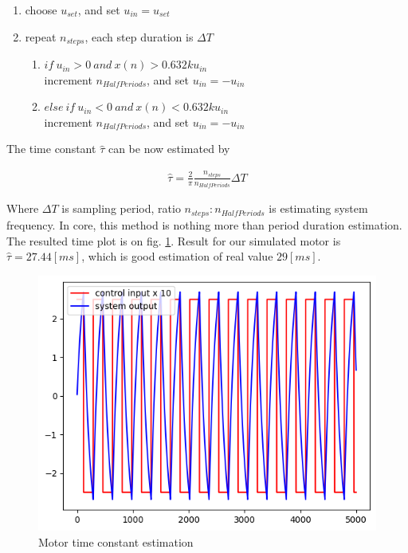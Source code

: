 \documentclass[12pt,twoside,onecolumn,openany,extrafontsizes,dvipsnames]{memoir}
\begin{document}
            \begin{enumerate}
                \item choose $u_{set}$, and set $u_{in} = u_{set}$
                \item repeat $n_{steps}$, each step duration is $\Delta T$
                    \begin{enumerate}
                        \item $if\ u_{in} > 0\ and\ x(n) > 0.632ku_{in}$ \\
                            increment $n_{HalfPeriods}$, and set $u_{in} = -u_{in}$
                        \item $else\ if\ u_{in} < 0\ and\ x(n) < 0.632ku_{in}$ \\
                            increment $n_{HalfPeriods}$, and set $u_{in} = -u_{in}$
                    \end{enumerate}
            \end{enumerate}

            The time constant $\hat{\tau}$ can be now estimated by 

            \begin{align}   
                \hat{\tau} = \frac{2}{\pi}\frac{n_{steps}}{n_{HalfPeriods}}{\Delta T}
            \end{align}

            Where $\Delta T$ is sampling period, ratio ${n_{steps}} : {n_{HalfPeriods}}$ is
            estimating system frequency. In core, this method is nothing more than  period 
            duration estimation. The resulted time plot is on fig.  \ref{fig:motor_time_constant_estimation}.
            Result for our simulated motor is $\hat{\tau} = 27.44[ms]$, which is good estimation of real value $29 [ms]$.

            \begin{figure}[!htb]
                \centering
                \includegraphics[scale=0.6]{../images/motor_control/motor_time_constant_estimation.png}
                \caption{Motor time constant estimation}
                \label{fig:motor_time_constant_estimation}
            \end{figure}
            
\end{document}
